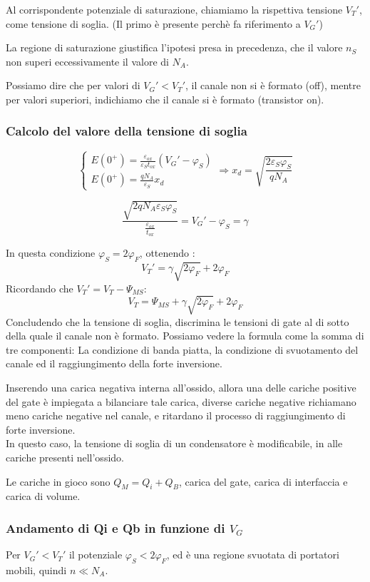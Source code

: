 \documentclass[../template]{subfiles}
\begin{document}
 Al corrispondente potenziale di saturazione, chiamiamo la rispettiva tensione $V_T'$, come tensione di soglia. (Il primo è presente perchè fa riferimento a $V_G'$)

La regione di saturazione giustifica l'ipotesi presa in precedenza, che il valore $n_S$ non superi eccessivamente il valore di $N_A$.

Possiamo dire che per valori di $V_G' < V_T'$, il canale non si è formato (off), mentre per valori superiori, indichiamo che il canale si è formato (transistor on).

\subsubsection{Calcolo del valore della tensione di soglia}
\[
\begin{cases}
    E(0^+) = \frac{\varepsilon_{ox}}{\varepsilon_S t_{ox}} (V_G' - \varphi_S)
    \\
    E(0^+) = \frac{q N_A}{\varepsilon_S} x_d
\end{cases}
\Rightarrow x_d = \sqrt{\frac{2\varepsilon_S \varphi_S}{q N_A}}
\]

\[
    \frac{\sqrt{2 q N_A \varepsilon_S \varphi_S}}{\frac{\varepsilon_{ox}}{t_{ox}}} = V_G' - \varphi_S = \gamma
\]

In questa condizione $\varphi_S = 2 \varphi_F$, ottenendo :
\[
    V_T' = \gamma \sqrt{2 \varphi_F} + 2 \varphi_F
\]
Ricordando che $V_T' = V_T - \Psi_{MS}$:
\[
    V_T = \Psi_{MS} + \gamma \sqrt{2 \varphi_F} + 2 \varphi_F
\]
Concludendo che la tensione di soglia, discrimina le tensioni di gate al di sotto della quale il canale non è formato.
Possiamo vedere la formula come la somma di tre componenti:
La condizione di banda piatta, la condizione di svuotamento del canale ed il raggiungimento della forte inversione.


Inserendo una carica negativa interna all'ossido, allora una delle cariche positive del gate è impiegata a bilanciare
tale carica, diverse cariche negative richiamano meno cariche negative nel canale, e ritardano il processo di raggiungimento di forte inversione.
\\
In questo caso, la tensione di soglia di un condensatore è modificabile, in alle cariche presenti nell'ossido.

Le cariche in gioco sono $Q_M = Q_i + Q_B$, carica del gate, carica di interfaccia e carica di volume.
\subsubsection{Andamento di Qi e Qb in funzione di $V_G$}
Per $V_G' < V_T'$ il potenziale $\varphi_S < 2 \varphi_F$, ed è una regione svuotata di portatori mobili, quindi $n \ll N_A$.
\end{document}
